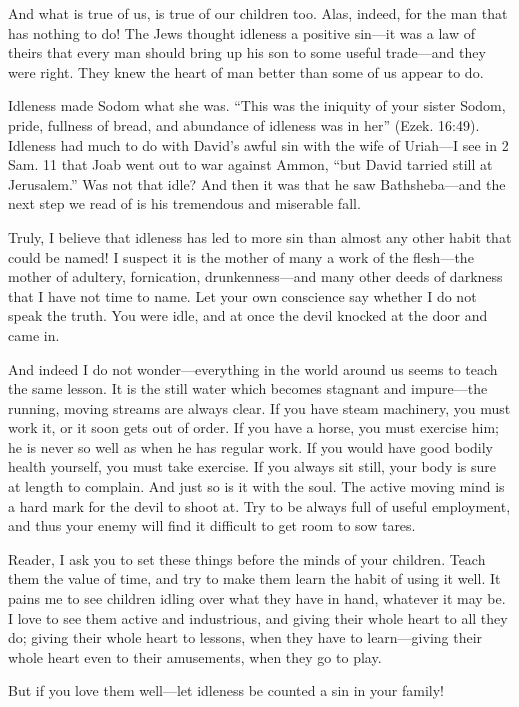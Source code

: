 \documentclass[
]{book}
\begin{document}
And what is true of us, is true of our children too. Alas, indeed, for the man that has nothing to do! The Jews thought idleness a positive sin---it was a law of theirs that every man should bring up his son to some useful trade---and they were right. They knew the heart of man better than some of us appear to do.

Idleness made Sodom what she was. ``This was the iniquity of your sister Sodom, pride, fullness of bread, and abundance of idleness was in her'' (Ezek. 16:49). Idleness had much to do with David's awful sin with the wife of Uriah---I see in 2 Sam. 11 that Joab went out to war against Ammon, ``but David tarried still at Jerusalem.'' Was not that idle? And then it was that he saw Bathsheba---and the next step we read of is his tremendous and miserable fall.

Truly, I believe that idleness has led to more sin than almost any other habit that could be named! I suspect it is the mother of many a work of the flesh---the mother of adultery, fornication, drunkenness---and many other deeds of darkness that I have not time to name. Let your own conscience say whether I do not speak the truth. You were idle, and at once the devil knocked at the door and came in.

And indeed I do not wonder---everything in the world around us seems to teach the same lesson. It is the still water which becomes stagnant and impure---the running, moving streams are always clear. If you have steam machinery, you must work it, or it soon gets out of order. If you have a horse, you must exercise him; he is never so well as when he has regular work. If you would have good bodily health yourself, you must take exercise. If you always sit still, your body is sure at length to complain. And just so is it with the soul. The active moving mind is a hard mark for the devil to shoot at. Try to be always full of useful employment, and thus your enemy will find it difficult to get room to sow tares.

Reader, I ask you to set these things before the minds of your children. Teach them the value of time, and try to make them learn the habit of using it well. It pains me to see children idling over what they have in hand, whatever it may be. I love to see them active and industrious, and giving their whole heart to all they do; giving their whole heart to lessons, when they have to learn---giving their whole heart even to their amusements, when they go to play.

But if you love them well---let idleness be counted a sin in your family!
\end{document}
